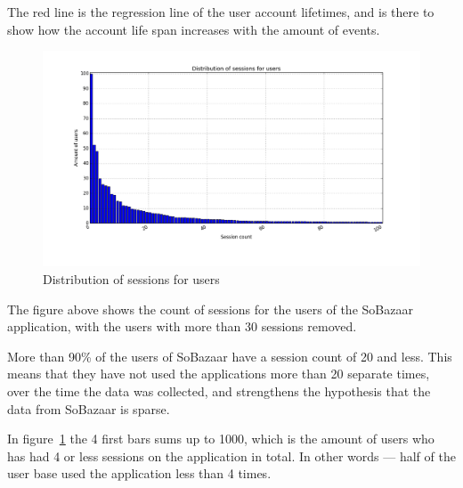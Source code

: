         The red line is the regression line of the user account lifetimes, and is there to show how the account life span increases with the amount of events.

    \begin{figure}[H]
        \includegraphics[width=5in]{image/sessiondistribution.png}
        \centering
        \caption{Distribution of sessions for users}
    \label{figure:sessCountDist}
    \end{figure}
        The figure above shows the count of sessions for the users of the SoBazaar application, with the users with more than 30 sessions removed.

        More than 90\% of the users of SoBazaar have a session count of 20 and less.
        This means that they have not used the applications more than 20 separate times, over the time the data was collected, and strengthens the hypothesis that the data from SoBazaar is sparse.

        In figure~\ref{figure:sessCountDist} the 4 first bars sums up to 1000, which is the amount of users who has had 4 or less sessions on the application in total. In other words --- half of the user base used the application less than 4 times.


